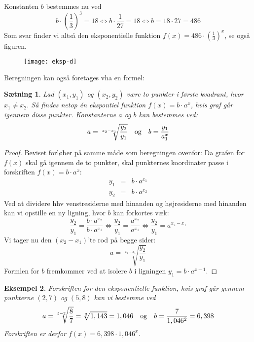 \documentclass[12pt,oneside,a4paper]{article}
\newcommand{\bas}{\begin{eqnarray*}}
\newcommand{\eas}{\end{eqnarray*}}
\newtheorem{thm}{Sætning}[section]
\newtheorem{eks}[thm]{Eksempel}
\begin{document}
Konstanten $b$ bestemmes nu ved
$$
b \cdot \left(\frac{1}{3}\right)^3 = 18 \Leftrightarrow
b \cdot \frac{1}{27} = 18  \Leftrightarrow
b = 18\cdot 27 = 486
$$
Som svar finder vi altså den eksponentielle funktion $f(x) = 486\cdot \left(\frac{1}{3}\right)^x$, se også figuren.

\begin{figure}[ht]
    \centering
    \texttt{[image: eksp-d]}
    \label{eksp-d}
\end{figure}

Beregningen kan også foretages vha en formel:
\begin{thm}
    Lad $(x_1,y_1)$ og $(x_2,y_2)$ være to punkter i første kvadrant, hvor $x_1
    \neq x_2$. Så findes netop én ekspontiel funktion $f(x) = b \cdot a^x$, hvis graf går igennem disse punkter.
    Konstanterne $a$ og $b$ kan bestemmes ved:
    $$
    a = \sqrt[x_2-x_1]{\frac{y_2}{y_1}} \quad \hbox{og} \quad b = \frac{y_1}{a^x_1}
    $$
\end{thm}
\begin{proof}
    Beviset forløber på samme måde som beregningen ovenfor: Da grafen for $f(x)$ skal gå igennem de to punkter,
    skal punkternes koordinater passe i forskriften $f(x) = b\cdot a^x$:
    \bas
    y_1 &=& b \cdot a^{x_1} \\
    y_2 &=& b\cdot  a^{x_2}
    \eas
    Ved at dividere hhv venstresiderne med hinanden og højresiderne med hinanden kan vi opstille en ny ligning,
    hvor $b$ kan forkortes væk:
    $$
    \frac{y_2}{y_1} = \frac{b\cdot  a^{x_2}}{b \cdot a^{x_1}} \Leftrightarrow
    \frac{y_2}{y_1} = \frac{a^{x_2}}{a^{x_1}} \Leftrightarrow
    \frac{y_2}{y_1} = a^{x_2-x_1} 
    $$
    Vi tager nu den $(x_2-x_1)$'te rod på begge sider:
    $$
    a = \sqrt[x_2-x_1]{\frac{y_2}{y_1}}
    $$
    Formlen for $b$ fremkommer ved at isolere $b$ i ligningen $y_1 = b\cdot  a^{x-1}$.
\end{proof}

\begin{eks}
    Forskriften for den eksponentielle funktion, hvis graf går gennem punkterne $(2, 7)$ og $(5, 8)$ kan vi bestemme ved
    $$
    a = \sqrt[5-2]{\frac{8}{7}} = \sqrt[3]{1,143} = 1,046 \quad \hbox{og} \quad b = \frac{7}{1,046^2} = 6,398
    $$
    Forskriften er derfor $f(x) = 6,398 \cdot 1,046^x$.
\end{eks}
\end{document}
